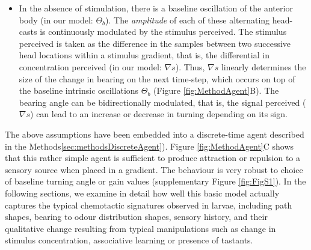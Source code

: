 \documentclass[11pt,a4paper]{article}
\newcommand{\todoBW}[1]{\todo[author=BW,color=orange, size=\tiny,inline]{1}}
\begin{document}
\begin{itemize}
\item In the absence of stimulation, there is a baseline oscillation of the anterior body (in our model: $\Theta_b$). The {\it amplitude} of each of these alternating head-casts is  continuously modulated by the stimulus perceived. %
 The stimulus perceived is taken as the difference in the samples between two successive head locations within a stimulus gradient, that is, the differential in concentration perceived (in our model: $\nabla s$). Thus, $\nabla s$ linearly determines the size of the change in bearing on the next time-step, which occurs on top of the baseline intrinsic oscillations $\Theta_b$ (Figure \ref{fig:MethodAgent}B). The bearing angle can be bidirectionally modulated, that is, the signal perceived ($\nabla s$) can lead to an increase or decrease in turning depending on its sign.  
 

\end{itemize}

The above assumptions have been embedded into a discrete-time agent described in the Methods\ref{sec:methodsDiscreteAgent}). Figure \ref{fig:MethodAgent}C shows that this rather simple agent is sufficient to produce attraction or repulsion
 to a sensory source when placed in a gradient.  The behaviour is very robust to choice of baseline turning angle or gain values (supplementary Figure \ref{fig:FigS1}). In the following sections, we examine in detail how well this basic model actually captures the typical chemotactic signatures observed in larvae, including path shapes, bearing to odour distribution shapes, sensory history, and their qualitative change resulting from typical manipulations such as change in stimulus concentration, associative learning or presence of tastants. 
\end{document}
